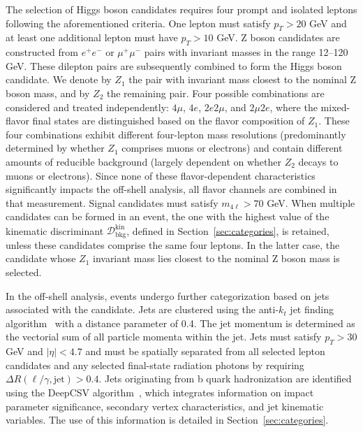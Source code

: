 The selection of Higgs boson candidates requires four prompt and isolated leptons following the aforementioned criteria. 
One lepton must satisfy $p_T>20$ GeV and at least one additional lepton must have $p_T>10$ GeV.
Z boson candidates are constructed from $e^+e^-$ or $\mu^+\mu^-$ pairs with invariant masses in the range 12--120 GeV. 
These dilepton pairs are subsequently combined to form the Higgs boson candidate. 
We denote by $Z_1$ the pair with invariant mass closest to the nominal Z boson mass, 
and by $Z_2$ the remaining pair. Four possible combinations are considered and treated independently: 
$4\mu$, $4e$, $2e2\mu$, and $2\mu2e$, where the mixed-flavor final states are distinguished based on the flavor composition of $Z_{1}$. 
These four combinations exhibit different four-lepton mass resolutions (predominantly determined by whether $Z_{1}$ comprises muons or electrons) 
and contain different amounts of reducible background (largely dependent on whether $Z_{2}$ decays to muons or electrons).
Since none of these flavor-dependent characteristics significantly impacts the off-shell \Hboson analysis, 
all flavor channels are combined in that measurement. 
Signal candidates must satisfy $m_{4\ell} > 70$ GeV. 
When multiple \Hboson candidates can be formed in an event, the one with the highest value of the 
kinematic discriminant $\mathcal{D}_\text{bkg}^\text{kin}$, defined in Section~\ref{sec:categories},
is retained, unless these candidates comprise the same four leptons. 
In the latter case, the candidate whose $Z_1$ invariant mass lies closest to the nominal Z boson mass is selected.

In the off-shell analysis, events undergo further categorization based on jets associated with the \Hboson candidate. 
Jets are clustered using the anti-$k_t$ jet finding algorithm~\cite{Cacciari:2008gp,Cacciari:2011ma} with a distance 
parameter of 0.4. The jet momentum is determined as the vectorial sum of all particle momenta within the jet. 
Jets must satisfy $p_T>30$ GeV and $|\eta|<4.7$ and must be spatially separated
from all selected lepton candidates and any selected final-state radiation photons by requiring 
$\Delta R(\ell/\gamma,\text{jet})>0.4$.
Jets originating from b quark hadronization are identified using the DeepCSV algorithm~\cite{Sirunyan:2017ezt}, which integrates information 
on impact parameter significance, secondary vertex characteristics, and jet kinematic variables. The use of this information is detailed in Section~\ref{sec:categories}.

